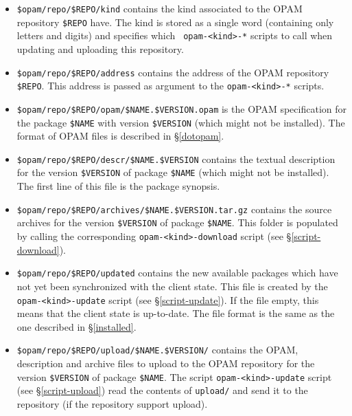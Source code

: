 \documentclass[a4paper,11pt]{article}
\begin{document}
\begin{itemize}

\item \verb+$opam/repo/$REPO/kind+ contains the kind associated to the
  OPAM repository \verb+$REPO+ have. The kind is stored as a single
  word (containing only letters and digits) and specifies which {\tt
    opam-<kind>-*} scripts to call when updating and uploading this
  repository.

\item \verb+$opam/repo/$REPO/address+ contains the address of the
  OPAM repository \verb+$REPO+. This address is passed as argument to
  the {\tt opam-<kind>-*} scripts.

\item \verb+$opam/repo/$REPO/opam/$NAME.$VERSION.opam+ is the OPAM
  specification for the package \verb+$NAME+ with version
  \verb+$VERSION+ (which might not be installed). The format of OPAM
  files is described in \S\ref{dotopam}.

\item \verb+$opam/repo/$REPO/descr/$NAME.$VERSION+ contains the textual
  description for the version \verb+$VERSION+ of package \verb+$NAME+
  (which might not be installed). The first line of this file is the
  package synopsis.

\item \verb+$opam/repo/$REPO/archives/$NAME.$VERSION.tar.gz+ contains
  the source archives for the version \verb+$VERSION+ of package
  \verb+$NAME+. This folder is populated by calling the corresponding
  {\tt opam-<kind>-download} script (see \S\ref{script-download}).

\item \verb+$opam/repo/$REPO/updated+ contains the new available
  packages which have not yet been synchronized with the client
  state. This file is created by the {\tt opam-<kind>-update} script
  (see \S\ref{script-update}). If the file empty, this means that the
  client state is up-to-date. The file format is the same as the one
  described in \S\ref{installed}.

\item \verb+$opam/repo/$REPO/upload/$NAME.$VERSION/+ contains the
  OPAM, description and archive files to upload to the OPAM repository
  for the version \verb+$VERSION+ of package \verb+$NAME+. The script
  {\tt opam-<kind>-update} script (see \S\ref{script-upload}) read the
  contents of {\tt upload/} and send it to the repository (if the
  repository support upload).

\end{itemize}
\end{document}
